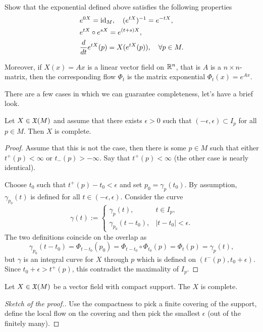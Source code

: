 \begin{exercise}
  Show that the exponential defined above satisfies the following properties
  \begin{align}
    &e^{0X} = \operatorname{id}_M, \quad (e^{tX})^{-1} = e^{-tX}, \\
    &e^{t X}\circ e^{s X}= e^{(t+s)X},\\
    &\frac{d}{d t} e^{tX} (p) = X(e^{tX}(p)), \quad \forall p\in M.
  \end{align}

  Moreover, if $X(x) = Ax$ is a linear vector field on $\mathbb{R}^n$, that is $A$ is a $n\times n$-matrix, then the corresponding flow $\Phi_t$ is the matrix exponential $\Phi_t(x) = e^{Ax}$.
\end{exercise}

There are a few cases in which we can guarantee completeness, let's have a brief look.

\begin{lemma}\label{lemma:charactCompleteVF}
  Let $X\in\mathfrak{X}(M)$ and assume that there exists $\epsilon >0$ such that $(-\epsilon, \epsilon)\subset I_p$ for all $p \in M$.
  Then $X$ is complete.
\end{lemma}
\begin{proof}
  Assume that this is not the case, then there is some $p\in M$ such that either $t^+(p) < \infty$ or $t_-(p)>-\infty$.
  Say that $t^+(p) < \infty$ (the other case is nearly identical).
  
  Choose $t_0$ such that $t^+(p) - t_0 < \epsilon$ and set $p_0 = \gamma_p(t_0)$. By assumption, $\gamma_{p_0}(t)$ is defined for all $t\in(-\epsilon, \epsilon)$. Consider the curve
  \begin{equation}
    \gamma(t) := \begin{cases}
      \gamma_p(t), & t\in I_p,\\
      \gamma_{p_0}(t-t_0), & |t-t_0|<\epsilon.
    \end{cases}
  \end{equation}
  The two definitions coincide on the overlap as
  \begin{equation}
    \gamma_{p_0}(t-t_0) = \Phi_{t-t_0}(p_0) = \Phi_{t-t_0}\circ\Phi_{t_0}(p) = \Phi_t(p) = \gamma_p(t),
  \end{equation}
  but $\gamma$ is an integral curve for $X$ through $p$ which is defined on $(t^-(p), t_0+\epsilon)$.
  Since $t_0 + \epsilon > t^+(p)$, this contradict the maximality of $I_p$.
\end{proof}

\begin{corollary}
  Let $X\in\mathfrak{X}(M)$ be a vector field with compact support. The $X$ is complete.
\end{corollary}
\begin{proof}[Sketch of the proof.]
  Use the compactness to pick a finite covering of the support, define the local flow on the covering and then pick the smallest $\epsilon$ (out of the finitely many).
\end{proof}

